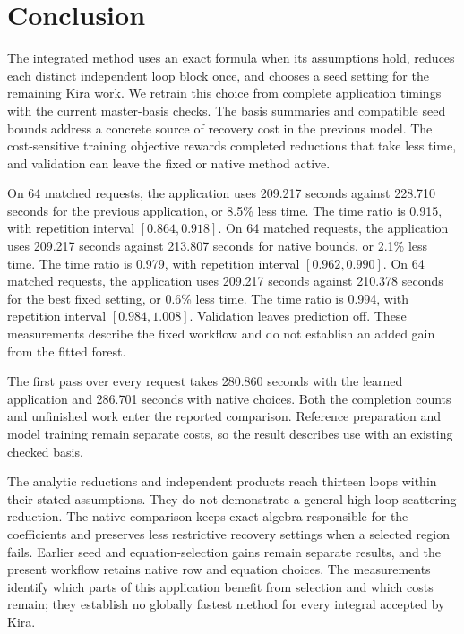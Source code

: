 \section{Conclusion}
The integrated method uses an exact formula when its assumptions hold, reduces each distinct independent loop block once, and chooses a seed setting for the remaining Kira work. We retrain this choice from complete application timings with the current master-basis checks. The basis summaries and compatible seed bounds address a concrete source of recovery cost in the previous model. The cost-sensitive training objective rewards completed reductions that take less time, and validation can leave the fixed or native method active.

On 64 matched requests, the application uses 209.217 seconds against 228.710 seconds for the previous application, or 8.5\% less time. The time ratio is 0.915, with repetition interval $[0.864,0.918]$. On 64 matched requests, the application uses 209.217 seconds against 213.807 seconds for native bounds, or 2.1\% less time. The time ratio is 0.979, with repetition interval $[0.962,0.990]$. On 64 matched requests, the application uses 209.217 seconds against 210.378 seconds for the best fixed setting, or 0.6\% less time. The time ratio is 0.994, with repetition interval $[0.984,1.008]$. Validation leaves prediction off. These measurements describe the fixed workflow and do not establish an added gain from the fitted forest.

The first pass over every request takes 280.860 seconds with the learned application and 286.701 seconds with native choices. Both the completion counts and unfinished work enter the reported comparison. Reference preparation and model training remain separate costs, so the result describes use with an existing checked basis.

The analytic reductions and independent products reach thirteen loops within their stated assumptions. They do not demonstrate a general high-loop scattering reduction. The native comparison keeps exact algebra responsible for the coefficients and preserves less restrictive recovery settings when a selected region fails. Earlier seed and equation-selection gains remain separate results, and the present workflow retains native row and equation choices. The measurements identify which parts of this application benefit from selection and which costs remain; they establish no globally fastest method for every integral accepted by Kira.
